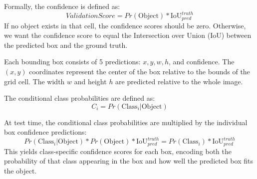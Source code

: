 \documentclass[11pt]{report}
\begin{document}
Formally, the confidence is defined as:
\begin{equation}
    Validation Score = Pr(\text{Object}) * \text{IoU}_{pred}^{truth}
\end{equation}
If no object exists in that cell, the confidence scores should be zero. Otherwise, we want the confidence score to equal the Intersection over Union (IoU) between the predicted box and the ground truth.

Each bounding box consists of 5 predictions: $x, y, w, h$, and confidence. The $(x, y)$ coordinates represent the center of the box relative to the bounds of the grid cell. The width $w$ and height $h$ are predicted relative to the whole image. 

The conditional class probabilities are defined as:
\begin{equation}
    C_i = Pr(\text{Class}_i | \text{Object})
\end{equation}

At test time, the conditional class probabilities are multiplied by the individual box confidence predictions:
\begin{equation}
    Pr(\text{Class}_i | \text{Object}) * Pr(\text{Object}) * \text{IoU}_{pred}^{truth} = Pr(\text{Class}_i) * \text{IoU}_{pred}^{truth}
\end{equation}
This yields class-specific confidence scores for each box, encoding both the probability of that class appearing in the box and how well the predicted box fits the object.
\end{document}
